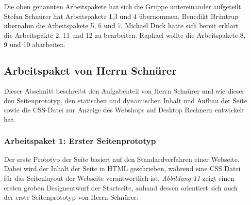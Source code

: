 Die oben genannten Arbeitspakete hat sich die Gruppe untereinander aufgeteilt. Stefan Schnürer hat Arbeitspakete 1,3 und 4 übernommen. Benedikt Brüntrup übernahm die Arbeitspakete 5, 6 und 7. Michael Dück hatte sich bereit erklärt die Arbeitspakte 2, 11 und 12 zu bearbeiten. Raphael wollte die Arbeitspakete 8, 9 und 10 abarbeiten.



\newpage
\subsection{Arbeitspaket von Herrn Schnürer}

Dieser Abschnitt beschreibt den Aufgabenteil von Herrn Schnürer und wie dieser den Seitenprototyp, den statischen und dynamischen Inhalt und Aufbau der Seite sowie die CSS-Datei zur Anzeige des Webshops auf Desktop Rechnern entwickelt hat.


\subsubsection{Arbeitspaket 1: Erster Seitenprototyp}

Der erste Prototyp der Seite basiert auf den Standardverfahren einer Webseite. Dabei wird der Inhalt der Seite in HTML geschrieben, während eine CSS Datei für das Seitenlayout der Webseite verantwortlich ist. \textit{Abbildung 11} zeigt einen ersten groben Designentwurf der Startseite, anhand dessen orientiert sich auch der erste Seitenprototyp von Herrn Schnürer:

